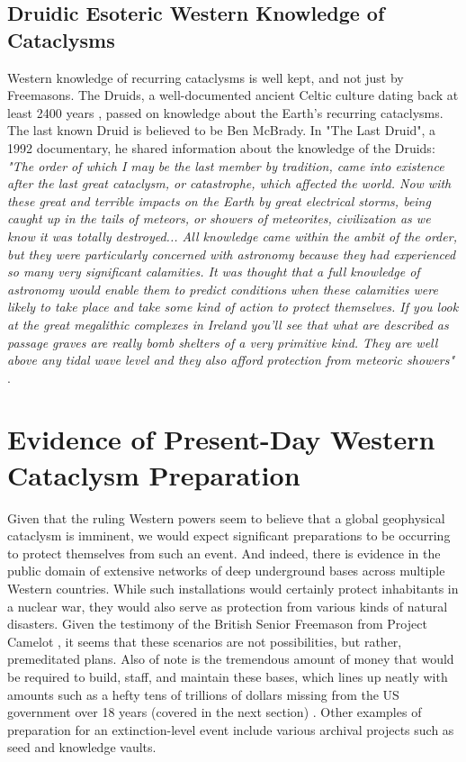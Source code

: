 \documentclass[10pt,twocolumn,letterpaper]{article}
\begin{document}
\subsection{Druidic Esoteric Western Knowledge of Cataclysms}

Western knowledge of recurring cataclysms is well kept, and not just by Freemasons. The Druids, a well-documented ancient Celtic culture dating back at least 2400 years \cite{7}, passed on knowledge about the Earth's recurring cataclysms. The last known Druid is believed to be Ben McBrady. In "The Last Druid", a 1992 documentary, he shared information about the knowledge of the Druids: \textit{"The order of which I may be the last member by tradition, came into existence after the last great cataclysm, or catastrophe, which affected the world. Now with these great and terrible impacts on the Earth by great electrical storms, being caught up in the tails of meteors, or showers of meteorites, civilization as we know it was totally destroyed... All knowledge came within the ambit of the order, but they were particularly concerned with astronomy because they had experienced so many very significant calamities. It was thought that a full knowledge of astronomy would enable them to predict conditions when these calamities were likely to take place and take some kind of action to protect themselves. If you look at the great megalithic complexes in Ireland you'll see that what are described as passage graves are really bomb shelters of a very primitive kind. They are well above any tidal wave level and they also afford protection from meteoric showers"} \cite{8,9}.


\section{Evidence of Present-Day Western Cataclysm Preparation}

Given that the ruling Western powers seem to believe that a global geophysical cataclysm is imminent, we would expect significant preparations to be occurring to protect themselves from such an event. And indeed, there is evidence in the public domain of extensive networks of deep underground bases across multiple Western countries. While such installations would certainly protect inhabitants in a nuclear war, they would also serve as protection from various kinds of natural disasters. Given the testimony of the British Senior Freemason from Project Camelot \cite{4,6}, it seems that these scenarios are not possibilities, but rather, premeditated plans. Also of note is the tremendous amount of money that would be required to build, staff, and maintain these bases, which lines up neatly with amounts such as a hefty tens of trillions of dollars missing from the US government over 18 years (covered in the next section) \cite{11,12,13}. Other examples of preparation for an extinction-level event include various archival projects such as seed and knowledge vaults.
\end{document}
